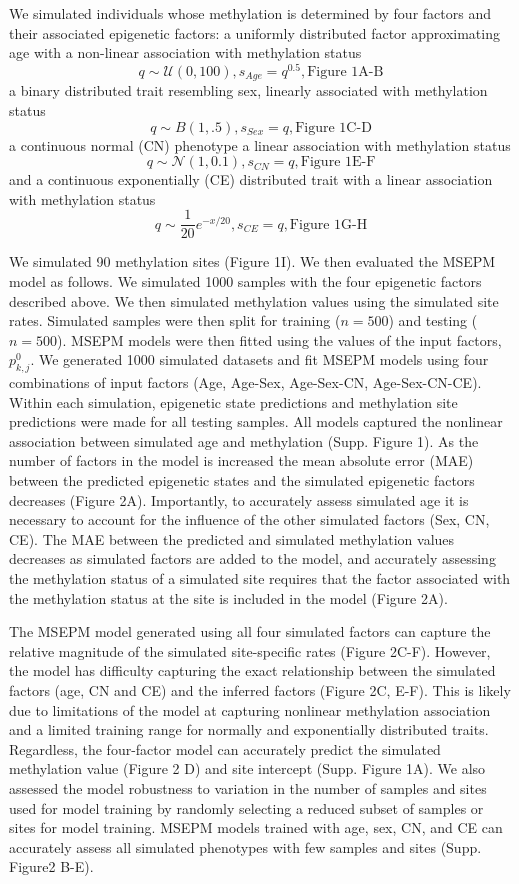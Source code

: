 \documentclass[sn-nature]{sn-jnl}
\begin{document}
{\begin{linenumbers}
We simulated individuals whose methylation is determined by four factors and their associated epigenetic factors: 
a uniformly distributed factor approximating age with a non-linear association with methylation status 
$$q \sim\mathcal{U}(0,100), s_{Age}=q^{0.5}, \text{Figure 1A-B}$$ a binary distributed trait resembling sex, linearly associated 
with methylation status $$q \sim B(1,.5), s_{Sex}=q, \text{Figure 1C-D}$$ a continuous normal (CN) phenotype a linear 
association with methylation status $$q \sim\mathcal{N}(1, 0.1), s_{CN}=q, 
\text{Figure 1E-F}$$ and a 
continuous exponentially (CE) distributed trait with a linear association with methylation status 
$$q \sim \frac{1}{20}e^{-x/20}, s_{CE}=q, \text{Figure 1G-H}$$ 


We simulated 90 methylation sites (Figure 1I). We then evaluated the MSEPM model as follows. We simulated 1000 samples with the 
four epigenetic factors described above. We then simulated methylation values using the simulated site rates. Simulated samples
 were then split for training ($n=500$) and testing ($n=500$). MSEPM models were then fitted using the values of the input factors, $p^0_{k,j}$. 
 We generated 1000 simulated datasets and fit MSEPM models using four combinations of input factors (Age, Age-Sex, Age-Sex-CN, Age-Sex-CN-CE). 
 Within each simulation, epigenetic state predictions and methylation site predictions were made for all testing samples. All models captured 
 the nonlinear association between simulated age and methylation (Supp. Figure 1). As the number of factors in the model is increased the mean 
 absolute error (MAE) between the predicted epigenetic states and the simulated epigenetic factors decreases (Figure 2A). Importantly, to accurately
  assess simulated age it is necessary to account for the influence of the other simulated factors (Sex, CN, CE). The MAE between the predicted 
  and simulated methylation values decreases as simulated factors are added to the model, and accurately assessing the methylation status of a 
  simulated site requires that the factor associated with the methylation status at the site is included in the model (Figure 2A). 

The MSEPM model generated using all four simulated factors can capture the relative magnitude of the simulated site-specific rates (Figure 2C-F).  
However, the model has difficulty capturing the exact relationship between the simulated factors (age, CN and CE) and the inferred 
factors (Figure 2C, E-F). This is likely due to limitations of the model at capturing nonlinear methylation association and a 
limited training range for normally and exponentially distributed traits. Regardless, the four-factor model can accurately 
predict the simulated methylation value (Figure 2 D) and site intercept (Supp. Figure 1A). We also assessed the model 
robustness to variation in the number of samples and sites used for model training by randomly selecting a reduced 
subset of samples or sites for model training. MSEPM models trained with age, sex, CN, and CE can accurately assess 
all simulated phenotypes with few samples and sites (Supp. Figure2 B-E). 


\end{linenumbers}}
\end{document}
